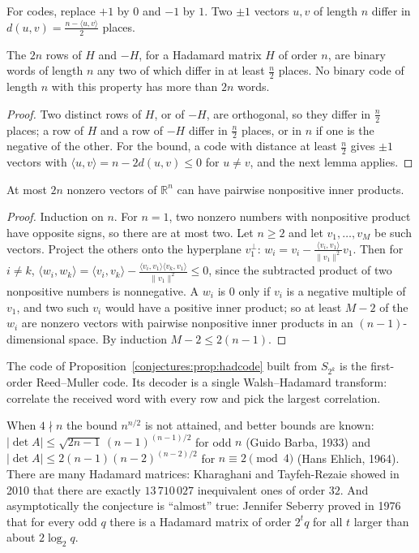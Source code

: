 For codes, replace $+1$ by $0$ and $-1$ by $1$. Two $\pm1$ vectors $u,v$ of length $n$ differ in $d(u,v)=\frac{n-\langle u,v\rangle}2$ places.

\begin{proposition}\label{conjectures:prop:hadcode}
The $2n$ rows of $H$ and $-H$, for a Hadamard matrix $H$ of order $n$, are binary words of length $n$ any two of which differ in at least $\frac n2$
places. No binary code of length $n$ with this property has more than $2n$ words.
\end{proposition}
\begin{proof}
Two distinct rows of $H$, or of $-H$, are orthogonal, so they differ in $\frac n2$ places; a row of $H$ and a row of $-H$ differ in $\frac n2$ places, or in
$n$ if one is the negative of the other. For the bound, a code with distance at least $\frac n2$ gives $\pm1$ vectors with
$\langle u,v\rangle=n-2d(u,v)\le0$ for $u\neq v$, and the next lemma applies.
\end{proof}

\begin{lemma}\label{conjectures:lem:obtuse}
At most $2n$ nonzero vectors of $\mathbb R^n$ can have pairwise nonpositive inner products.
\end{lemma}
\begin{proof}
Induction on $n$. For $n=1$, two nonzero numbers with nonpositive product have opposite signs, so there are at most two. Let $n\ge2$ and let
$v_1,\dots,v_M$ be such vectors. Project the others onto the hyperplane $v_1^\perp$: $w_i=v_i-\frac{\langle v_i,v_1\rangle}{\|v_1\|^2}v_1$. Then for
$i\neq k$, $\langle w_i,w_k\rangle=\langle v_i,v_k\rangle-\frac{\langle v_i,v_1\rangle\langle v_k,v_1\rangle}{\|v_1\|^2}\le0$, since the subtracted
product of two nonpositive numbers is nonnegative. A $w_i$ is $0$ only if $v_i$ is a negative multiple of $v_1$, and two such $v_i$ would have a positive
inner product; so at least $M-2$ of the $w_i$ are nonzero vectors with pairwise nonpositive inner products in an $(n-1)$-dimensional space. By
induction $M-2\le2(n-1)$.
\end{proof}

The code of Proposition~\ref{conjectures:prop:hadcode} built from $S_{2^k}$ is the first-order Reed--Muller code. Its decoder is a single Walsh--Hadamard
transform: correlate the received word with every row and pick the largest correlation.

\begin{remark}\label{conjectures:rem:barba}
When $4\nmid n$ the bound $n^{n/2}$ is not attained, and better bounds are known: $|\det A|\le\sqrt{2n-1}\,(n-1)^{(n-1)/2}$ for odd $n$ (Guido Barba,
1933) and $|\det A|\le2(n-1)(n-2)^{(n-2)/2}$ for $n\equiv2\pmod4$ (Hans Ehlich, 1964). There are many Hadamard matrices: Kharaghani and Tayfeh-Rezaie
showed in 2010 that there are exactly $13\,710\,027$ inequivalent ones of order $32$. And asymptotically the conjecture is ``almost'' true: Jennifer
Seberry proved in 1976 that for every odd $q$ there is a Hadamard matrix of order $2^tq$ for all $t$ larger than about $2\log_2q$.
\end{remark}

